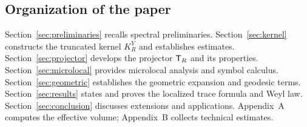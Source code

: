 \subsection{Organization of the paper}\label{subsec:outline}

Section~\ref{sec:preliminaries} recalls spectral preliminaries.  
Section~\ref{sec:kernel} constructs the truncated kernel $K_R^Y$ and establishes
estimates.  
Section~\ref{sec:projector} develops the projector $\mathsf{T}_R$ and its properties.  
Section~\ref{sec:microlocal} provides microlocal analysis and symbol calculus.  
Section~\ref{sec:geometric} establishes the geometric expansion and geodesic terms.  
Section~\ref{sec:results} states and proves the localized trace formula and Weyl law.  
Section~\ref{sec:conclusion} discusses extensions and applications.  
Appendix~A computes the effective volume; Appendix~B collects technical estimates.


